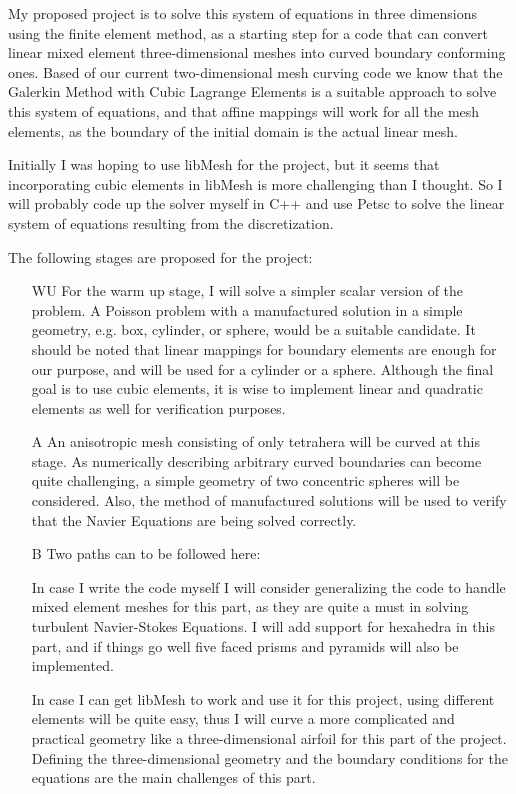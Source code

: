 \documentclass[letter,12pt]{article}
\begin{document}
My proposed project is to solve this system of equations in three
dimensions using the finite element method, as a starting step for a
code that can convert linear mixed element three-dimensional meshes
into curved boundary conforming ones. Based of our current
two-dimensional mesh curving code we know that the Galerkin Method
with Cubic Lagrange Elements is a suitable approach to solve this
system of equations, and that affine mappings will work for all the
mesh elements, as the boundary of the initial domain is the actual
linear mesh.

Initially I was hoping to use libMesh\cite{kirk} for the project, but
it seems that incorporating cubic elements in libMesh is more
challenging than I thought. So I will probably code up the solver
myself in C++ and use Petsc\cite{balay} to solve the linear system of
equations resulting from the discretization.

The following stages are proposed for the project:
%
\begin{itemize}
\item[WU] For the warm up stage, I will solve a simpler scalar
  version of the problem. A Poisson problem with a manufactured
  solution in a simple geometry, e.g. box, cylinder, or sphere, would
  be a suitable candidate. It should be noted that linear mappings for
  boundary elements are enough for our purpose, and will be used for a
  cylinder or a sphere. Although the final goal is to use cubic
  elements, it is wise to implement linear and quadratic elements as
  well for verification purposes.
%
\item[A] An anisotropic mesh consisting of only tetrahera will
  be curved at this stage. As numerically describing arbitrary curved
  boundaries can become quite challenging, a simple geometry of two
  concentric spheres will be considered. Also, the method of
  manufactured solutions will be used to verify that the Navier
  Equations are being solved correctly.
%
\item[B] Two paths can to be followed here:

 In case I write the code myself I will consider generalizing the code
 to handle mixed element meshes for this part, as they are quite a
 must in solving turbulent Navier-Stokes Equations. I will add support
 for hexahedra in this part, and if things go well five faced prisms
 and pyramids will also be implemented.

 In case I can get libMesh to work and use it for this project, using
 different elements will be quite easy, thus I will curve a more
 complicated and practical geometry like a three-dimensional airfoil
 for this part of the project. Defining the three-dimensional geometry
 and the boundary conditions for the equations are the main challenges
 of this part.
%
\end{itemize}

{}

\end{document}
